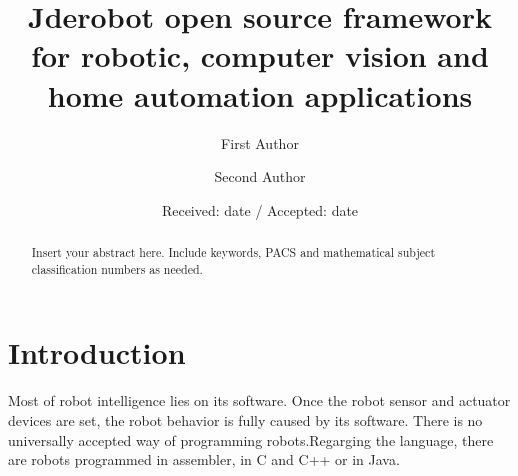 \documentclass[twocolumn]{svjour3}          %
\begin{document}
\title{Jderobot open source framework for robotic, computer vision and home automation applications
}


\author{First Author         \and
        Second Author %
}



\date{Received: date / Accepted: date}


\maketitle

\begin{abstract}
Insert your abstract here. Include keywords, PACS and mathematical
subject classification numbers as needed.
\end{abstract}

\section{Introduction}
\label{intro}

Most of robot intelligence lies on its software. Once the robot sensor and actuator devices are set, the robot behavior is fully caused by its software. There is no universally accepted way of programming robots.Regarging the language, there are robots programmed in assembler, in C and C++ or in Java. 
\end{document}
